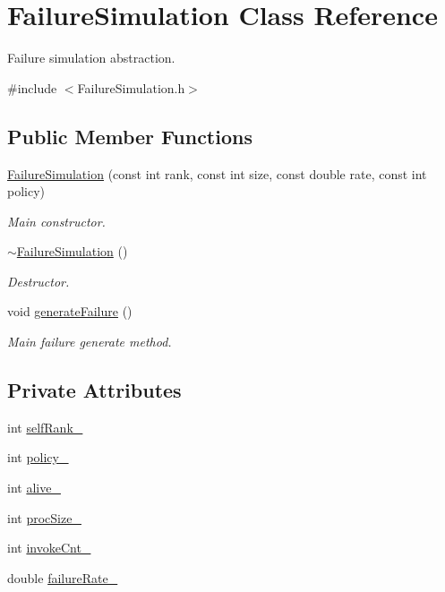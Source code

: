 \hypertarget{classFailureSimulation}{}\section{Failure\+Simulation Class Reference}
\label{classFailureSimulation}


Failure simulation abstraction.  




{\ttfamily \#include $<$Failure\+Simulation.\+h$>$}

\subsection*{Public Member Functions}
\begin{DoxyCompactItemize}
\item 
\hyperlink{classFailureSimulation_aa563bc2ff6ae789416157dc606cfe369}{Failure\+Simulation} (const int rank, const int size, const double rate, const int policy)
\begin{DoxyCompactList}\small\item\em Main constructor. \end{DoxyCompactList}\item 
\hyperlink{classFailureSimulation_a182f88052d30fad7b4e839f9fe6023fe}{$\sim$\+Failure\+Simulation} ()\hypertarget{classFailureSimulation_a182f88052d30fad7b4e839f9fe6023fe}{}\label{classFailureSimulation_a182f88052d30fad7b4e839f9fe6023fe}

\begin{DoxyCompactList}\small\item\em Destructor. \end{DoxyCompactList}\item 
void \hyperlink{classFailureSimulation_a5200e2f8a5ec5f6d4ce7f11d14085f82}{generate\+Failure} ()
\begin{DoxyCompactList}\small\item\em Main failure generate method. \end{DoxyCompactList}\end{DoxyCompactItemize}
\subsection*{Private Attributes}
\begin{DoxyCompactItemize}
\item 
int \hyperlink{classFailureSimulation_a37dba780d7b6177b01e369f1c2ed3466}{self\+Rank\+\_\+}
\item 
int \hyperlink{classFailureSimulation_a59f1e391b8056b83f2bde5450d3f95c2}{policy\+\_\+}
\item 
int \hyperlink{classFailureSimulation_af6c72fef61f03896df170bf262cab03e}{alive\+\_\+}
\item 
int \hyperlink{classFailureSimulation_a1f1cd48b5fe41eed41be69c20d6fe150}{proc\+Size\+\_\+}
\item 
int \hyperlink{classFailureSimulation_aefff5ead95ce91fc60cb8a814aa1ea06}{invoke\+Cnt\+\_\+}
\item 
double \hyperlink{classFailureSimulation_ad7db683f7b53f7ae2907aa2299bf30cd}{failure\+Rate\+\_\+}
\end{DoxyCompactItemize}


